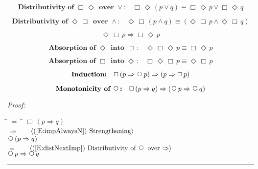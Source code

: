 \documentclass[fleqn, leqno]{article}
\newcommand{\lgap}{2pt}                             %
\newcommand{\mymathindent}{24pt}                    %
\newcommand{\Next}{\;\,\text{\raisebox{3.5pt}{\circle{6}}}}
\newcommand{\Event}{\Diamond\,}
\newcommand{\Always}{\Box\,}
\newcommand{\myqed}{\hfill\rule[-.23ex]{1.2ex}{2.0ex}}
\newcommand{\Gll} {\langle}                         %
\newcommand{\Ggg} {\rangle}                         %
\newcommand{\Hint}[1]     {\ \ \ $\Gll              \mbox{#1} \Ggg$ }   %
\begin{document}
\begin{equation}\label{E:distAlwaysEventOr}
\textbf{Distributivity of $\Always\Event$ over $\lor$:}\quad \Always\Event(p \lor q) \equiv \Always\Event p \lor \Always\Event q
\end{equation}


\begin{equation}\label{E:distEventAlwaysAnd}
\textbf{Distributivity of $\Event\Always$ over $\land$:}\quad \Event\Always(p \land q) \equiv (\Event\Always p \land \Event\Always q)
\end{equation}


\begin{equation}\label{E:eventAlwaysImp}
\Event\Always p \Rightarrow \Always\Event p
\end{equation}



\begin{equation}\label{E:absEvent}
\textbf{Absorption of $\Event$ into $\Always$:}\quad \Event\Always\Event p \equiv \Always\Event p
\end{equation}



\begin{equation}\label{E:absAlways}
\textbf{Absorption of $\Always$ into $\Event$:}\quad \Always\Event\Always p \equiv \Event\Always p
\end{equation}



\begin{equation}\label{E:induction}
\textbf{Induction:}\quad \Always (p \Rightarrow \Next p) \Rightarrow (p \Rightarrow \Always p)
\end{equation}



\begin{equation}\label{E:alwaysImpNexts}
\textbf{Monotonicity of $\Next$:}\quad \Always (p \Rightarrow q) \Rightarrow (\Next p \Rightarrow \Next q)
\end{equation}

\emph{Proof:}
\begin{tabbing}
\hspace{\mymathindent} \= $= \;$ \= \kill
  \> \>   $\Always (p \Rightarrow q)$\\[\lgap]
  \> $\Rightarrow$  \>  \Hint{(\ref{E:impAlwaysN}) Strengthening}\\[\lgap]
  \> \>   $\Next (p \Rightarrow q)$\\[\lgap]
  \> $=$  \>  \Hint{(\ref{E:distNextImp}) Distributivity of $\Next$ over $\Rightarrow$}\\[\lgap]
  \> \>   $\Next p \Rightarrow \Next q$\\[\lgap]  
\end{tabbing}
\myqed\\[\lgap]
\end{document}
